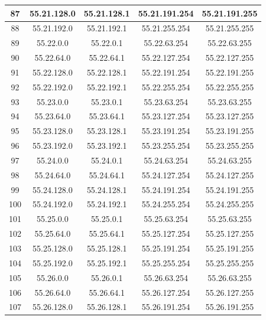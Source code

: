\documentclass[letterpaper,12pt]{article}
\begin{document}
\begin{center}
\begin{longtable}{|c|c|c|c|c|}
                87 & 55.21.128.0 & 55.21.128.1 & 55.21.191.254 & 55.21.191.255 \\ \hline
                88 & 55.21.192.0 & 55.21.192.1 & 55.21.255.254 & 55.21.255.255 \\ \hline
                89 & 55.22.0.0 & 55.22.0.1 & 55.22.63.254 & 55.22.63.255 \\ \hline
                90 & 55.22.64.0 & 55.22.64.1 & 55.22.127.254 & 55.22.127.255 \\ \hline
                91 & 55.22.128.0 & 55.22.128.1 & 55.22.191.254 & 55.22.191.255 \\ \hline
                92 & 55.22.192.0 & 55.22.192.1 & 55.22.255.254 & 55.22.255.255 \\ \hline
                93 & 55.23.0.0 & 55.23.0.1 & 55.23.63.254 & 55.23.63.255 \\ \hline
                94 & 55.23.64.0 & 55.23.64.1 & 55.23.127.254 & 55.23.127.255 \\ \hline
                95 & 55.23.128.0 & 55.23.128.1 & 55.23.191.254 & 55.23.191.255 \\ \hline
                96 & 55.23.192.0 & 55.23.192.1 & 55.23.255.254 & 55.23.255.255 \\ \hline
                97 & 55.24.0.0 & 55.24.0.1 & 55.24.63.254 & 55.24.63.255 \\ \hline
                98 & 55.24.64.0 & 55.24.64.1 & 55.24.127.254 & 55.24.127.255 \\ \hline
                99 & 55.24.128.0 & 55.24.128.1 & 55.24.191.254 & 55.24.191.255 \\ \hline
                100 & 55.24.192.0 & 55.24.192.1 & 55.24.255.254 & 55.24.255.255 \\ \hline
                101 & 55.25.0.0 & 55.25.0.1 & 55.25.63.254 & 55.25.63.255 \\ \hline
                102 & 55.25.64.0 & 55.25.64.1 & 55.25.127.254 & 55.25.127.255 \\ \hline
                103 & 55.25.128.0 & 55.25.128.1 & 55.25.191.254 & 55.25.191.255 \\ \hline
                104 & 55.25.192.0 & 55.25.192.1 & 55.25.255.254 & 55.25.255.255 \\ \hline
                105 & 55.26.0.0 & 55.26.0.1 & 55.26.63.254 & 55.26.63.255 \\ \hline
                106 & 55.26.64.0 & 55.26.64.1 & 55.26.127.254 & 55.26.127.255 \\ \hline
                107 & 55.26.128.0 & 55.26.128.1 & 55.26.191.254 & 55.26.191.255 \\ \hline

\end{longtable}
\end{center}
\end{document}
